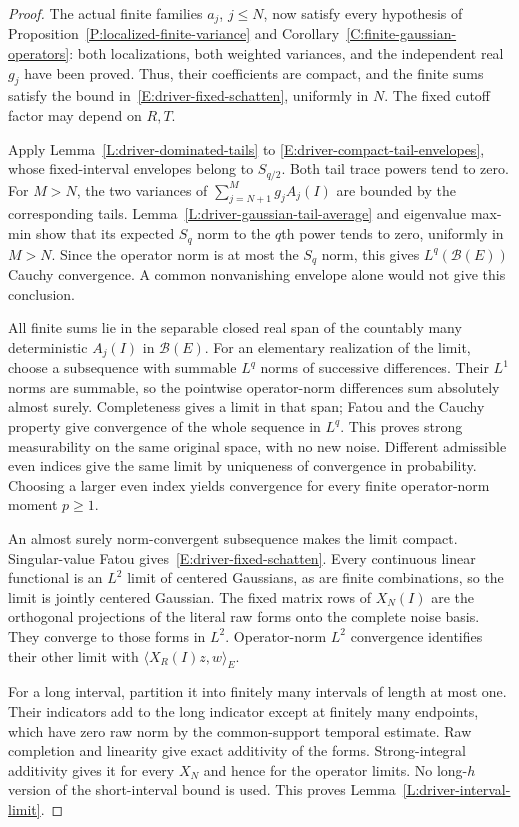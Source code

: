 \begin{proof}
  The actual finite families $a_j$, $j\le N$, now satisfy every hypothesis
  of Proposition~\ref{P:localized-finite-variance} and
  Corollary~\ref{C:finite-gaussian-operators}: both localizations, both
  weighted variances, and the independent real $g_j$ have been proved.
  Thus, their coefficients are compact, and the finite sums satisfy the
  bound in~\eqref{E:driver-fixed-schatten}, uniformly in $N$.
  The fixed cutoff factor may depend on $R,T$.

  Apply Lemma~\ref{L:driver-dominated-tails} to
  \eqref{E:driver-compact-tail-envelopes}, whose fixed-interval envelopes
  belong to $S_{q/2}$. Both tail trace powers tend to zero. For $M>N$,
  the two variances of $\sum_{j=N+1}^Mg_jA_j(I)$ are bounded by the
  corresponding tails. Lemma~\ref{L:driver-gaussian-tail-average} and
  eigenvalue max-min show that its expected $S_q$ norm to the $q$th power
  tends to zero, uniformly in $M>N$. Since the operator norm is at most
  the $S_q$ norm, this gives $L^q(\mathcal B(E))$ Cauchy convergence.
  A common nonvanishing envelope alone would not give this conclusion.

  All finite sums lie in the separable closed real span of the countably
  many deterministic $A_j(I)$ in $\mathcal B(E)$. For an elementary
  realization of the limit, choose a subsequence with summable $L^q$
  norms of successive differences. Their $L^1$ norms are summable, so
  the pointwise operator-norm differences sum absolutely almost surely.
  Completeness gives a limit in that span; Fatou and the Cauchy property
  give convergence of the whole sequence in $L^q$. This proves strong
  measurability on the same original space, with no new noise.
  Different admissible even indices give the same limit by uniqueness
  of convergence in probability. Choosing a larger even index yields
  convergence for every finite operator-norm moment $p\ge1$.

  An almost surely norm-convergent subsequence makes the limit compact.
  Singular-value Fatou gives~\eqref{E:driver-fixed-schatten}. Every
  continuous linear functional is an $L^2$ limit of centered Gaussians,
  as are finite combinations, so the limit is jointly centered Gaussian.
  The fixed matrix rows of $X_N(I)$ are the orthogonal projections of
  the literal raw forms onto the complete noise basis. They converge to
  those forms in $L^2$. Operator-norm $L^2$ convergence identifies their
  other limit with $\langle X_R(I)z,w\rangle_E$.

  For a long interval, partition it into finitely many intervals of length
  at most one. Their indicators add to the long indicator except at finitely
  many endpoints, which have zero raw norm by the common-support temporal
  estimate. Raw completion and linearity give exact additivity of the forms.
  Strong-integral additivity gives it for every $X_N$ and hence for the
  operator limits. No long-$h$ version of the short-interval bound is used.
  This proves Lemma~\ref{L:driver-interval-limit}.
\end{proof}

